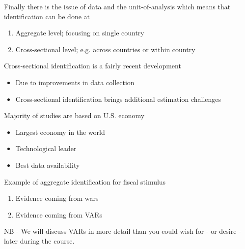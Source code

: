 \documentclass{beamer}
\begin{document}
\begin{frame}
 Finally there is the issue of data and the unit-of-analysis which means that identification can be done at
  \begin{enumerate}
    \item Aggregate level; focusing on single country
    \item Cross-sectional level; e.g. across countries or within country
  \end{enumerate}
  \medskip
  Cross-sectional identification is a fairly recent development
  \begin{itemize}
    \item Due to improvements in data collection
    \item Cross-sectional identification brings additional estimation challenges
  \end{itemize}
\end{frame}

\begin{frame}
 Majority of studies are based on U.S. economy
 \begin{itemize}
   \item Largest economy in the world
   \item Technological leader
   \item Best data availability
 \end{itemize}
\end{frame}

\begin{frame}
  Example of aggregate identification for fiscal stimulus
  \begin{enumerate}
    \item Evidence coming from wars
    \item Evidence coming from VARs
  \end{enumerate}
  \medskip
  NB - We will discuss VARs in more detail than you could wish for - or desire - later during the course.
\end{frame}
\end{document}
